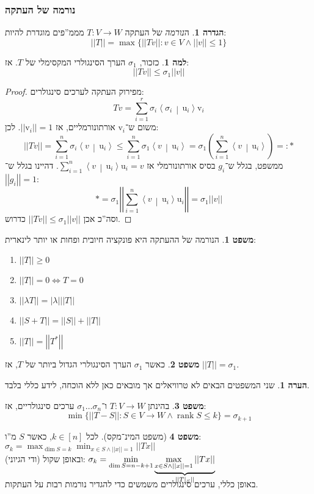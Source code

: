 \documentclass[a4paper]{article}
\newcommand\vrm   {\bm{\mathrm{v}}}
\newcommand\urm   {\bm{\mathrm{u}}}
\newcommand\ra    {\rangle}
\newcommand\la    {\langle}
\DeclareMathOperator{\rk}      {rank}
\newcommand\co        {\colon}
\newcommand\norm[1]   {\left \vert \left \vert #1 \right \vert \right \vert}
\newcommand\mut [2]   {\left \la #1 \,\middle|\, #2 \right \ra}
\renewcommand\lg      {\lambda}
\newcommand\sg        {\sigma}
\newcommand\sof[1]    {\left | #1 \right |}
\newcommand\cl [1]    {\left ( #1 \right )}
\theoremstyle{definition}
\newtheorem{Theorem}{\color{myblue}משפט}
\newtheorem{Definition}{\color{mygreen}הגדרה}
\newtheorem{Lemma}{\color{myyellow}למה}
\newtheorem{Remark}{\color{mycyan}הערה}
\newcommand\theo  [1] {\begin{Theorem}#1\end{Theorem}}
\newcommand\defi  [1] {\begin{Definition}#1\end{Definition}}
\newcommand\rmark [1] {\begin{Remark}#1\end{Remark}}
\newcommand\lem   [1] {\begin{Lemma}#1\end{Lemma}}
\begin{document}
	\subsubsection{נורמה של העתקה}
	\defi{ה\textit{נורמה} של העתקה $T \co V \to W$ מממ''פים מוגדרת להיות: 
	\[ \norm{T} = \max\{\norm{Tv} \co v \in V \land \norm{v} \le 1\} \]
	}
	\lem{כזכור, $\sg_1$ הערך הסינגולרי המקסימלי של $T$. אז: 
		\[ \norm{Tv} \le \sg_1 \norm{v} \]}
	\begin{proof}
		מפירוק העתקה לערכים סינגולרים: 
		\[ Tv = \sum_{i = 1}^{r}\sg_i \mut{\sg_i}{\urm_i}\vrm_i \]
		משום ש־$\vrm_i$ אורתונורמליים, אז $\norm{\vrm_i} = 1$. לכן: 
		\[ \norm{Tv} = \sum_{i = 1}^{n}\sg_i \mut{v}{\urm_i} \le \sum_{i = 1}^{n}\sg_1 \mut{v}{\urm_i} = \sg_1\cl{\sum_{i = 1}^{n}\mut{v}{\urm_i}} =: * \]
		ממשפט, בגלל ש־$g_i$ בסיס אורתונורמלי אז $\sum_{i = 1}^{n}\mut{v}{\urm_i}\urm_i = v$. דהיינו בגלל ש־$\norm{g_i} = 1$: 
		\[ *= \sg_1\norm{\sum_{i = 1}^{n}\mut{v}{\urm_i}\urm_i} = \sg_1 \norm{v} \] 
		וסה''כ אכן $\norm{Tv} \le \sg_1 \norm{v}$ כדרוש. 
	\end{proof}
	\theo{הנורמה של ההעתקה היא פונקציה חיובית ופחות או יותר לינארית: \begin{enumerate}
			\item \hfil $\norm{T} \ge 0$
			\item \hfil $\norm{T} = 0 \iff T = 0$
			\item \hfil $\norm{\lg T} = \sof{\lg }\norm{T}$
			\item \hfil $\norm{S + T} = \norm{S} + \norm{T}$
			\item \hfil $\norm{T} = \norm{T^*}$
	\end{enumerate}}
	\theo{כאשר $\sg_1$ הערך הסינגולרי הגדול ביותר של $T$, אז $\norm{T} = \sg_1$. }
	
	\rmark{שני המשפטים הבאים לא טרוויאלים אך מובאים כאן ללא הוכחה, לידע כללי בלבד. }
	\theo{בהינתן $T \co V \to W$ ו־$\sg_1 \dots \sg_n$ ערכים סינגולריים, אז: 
	\[ \min \{\norm{T - S} \co S \in V \to W \land \rk S \le k\} = \sg_{k + 1} \]}
	\begin{Theorem}[משפט המינ־מקס]
		לכל $k \in [n]$, כאשר $S$ מ''ו: \hfill 
		$\displaystyle \sg_k = \max_{\dim S = k} \min_{{x \in S\land \norm{x} = 1}} \!\!\!\norm{Tx}$ \\
		ובאופן שקול (ודי הגיוני): \hfill 
		$\displaystyle \sg_k = \min_{{\dim S = n - k + 1}} \smash{\underbrace{\max_{x \in S \land \norm{x} = 1} \norm{Tx}}_{\norm{T|_S}}}$
	\end{Theorem}
	באופן כללי, ערכים סינגולרים משמשים כדי להגדיר נורמות רבות על העתקות. 
	
\end{document}
